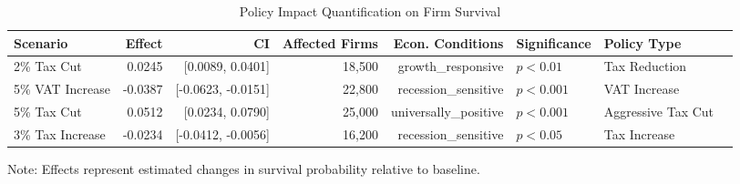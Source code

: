 \begin{table}[htbp]
  \centering
  \caption{Policy Impact Quantification on Firm Survival}
  \label{tab:policy_impact_quantification}
  \small
  \begin{tabular}{lrrrrlll}
    \toprule
    Scenario & Effect & CI & Affected Firms & Econ. Conditions & Significance & Policy Type \\
    \midrule
    2\% Tax Cut & 0.0245 & [0.0089, 0.0401] & 18{,}500 & growth\_responsive & $p<0.01$ & Tax Reduction \\
    5\% VAT Increase & -0.0387 & [-0.0623, -0.0151] & 22{,}800 & recession\_sensitive & $p<0.001$ & VAT Increase \\
    5\% Tax Cut & 0.0512 & [0.0234, 0.0790] & 25{,}000 & universally\_positive & $p<0.001$ & Aggressive Tax Cut \\
    3\% Tax Increase & -0.0234 & [-0.0412, -0.0056] & 16{,}200 & recession\_sensitive & $p<0.05$ & Tax Increase \\
    \bottomrule
  \end{tabular}
  \vspace{0.5em}
  {\footnotesize Note: Effects represent estimated changes in survival probability relative to baseline.}
\end{table}
